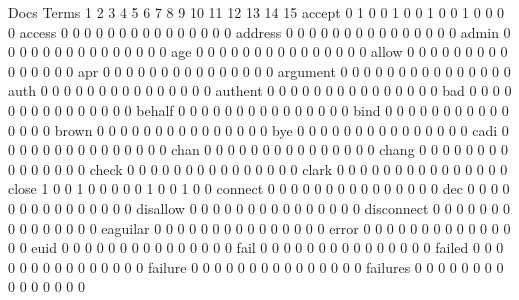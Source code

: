\documentclass[compress,8pt]{beamer}
\begin{document}
\begin{frame}
\begin{Schunk}
                                          Docs
Terms                                      1 2 3 4 5 6 7 8 9 10 11 12 13 14 15
  accept                                   0 1 0 0 1 0 0 1 0  0  1  0  0  0  0
  access                                   0 0 0 0 0 0 0 0 0  0  0  0  0  0  0
  address                                  0 0 0 0 0 0 0 0 0  0  0  0  0  0  0
  admin                                    0 0 0 0 0 0 0 0 0  0  0  0  0  0  0
  age                                      0 0 0 0 0 0 0 0 0  0  0  0  0  0  0
  allow                                    0 0 0 0 0 0 0 0 0  0  0  0  0  0  0
  apr                                      0 0 0 0 0 0 0 0 0  0  0  0  0  0  0
  argument                                 0 0 0 0 0 0 0 0 0  0  0  0  0  0  0
  auth                                     0 0 0 0 0 0 0 0 0  0  0  0  0  0  0
  authent                                  0 0 0 0 0 0 0 0 0  0  0  0  0  0  0
  bad                                      0 0 0 0 0 0 0 0 0  0  0  0  0  0  0
  behalf                                   0 0 0 0 0 0 0 0 0  0  0  0  0  0  0
  bind                                     0 0 0 0 0 0 0 0 0  0  0  0  0  0  0
  brown                                    0 0 0 0 0 0 0 0 0  0  0  0  0  0  0
  bye                                      0 0 0 0 0 0 0 0 0  0  0  0  0  0  0
  cadi                                     0 0 0 0 0 0 0 0 0  0  0  0  0  0  0
  chan                                     0 0 0 0 0 0 0 0 0  0  0  0  0  0  0
  chang                                    0 0 0 0 0 0 0 0 0  0  0  0  0  0  0
  check                                    0 0 0 0 0 0 0 0 0  0  0  0  0  0  0
  clark                                    0 0 0 0 0 0 0 0 0  0  0  0  0  0  0
  close                                    1 0 0 1 0 0 0 0 0  1  0  0  1  0  0
  connect                                  0 0 0 0 0 0 0 0 0  0  0  0  0  0  0
  dec                                      0 0 0 0 0 0 0 0 0  0  0  0  0  0  0
  disallow                                 0 0 0 0 0 0 0 0 0  0  0  0  0  0  0
  disconnect                               0 0 0 0 0 0 0 0 0  0  0  0  0  0  0
  eaguilar                                 0 0 0 0 0 0 0 0 0  0  0  0  0  0  0
  error                                    0 0 0 0 0 0 0 0 0  0  0  0  0  0  0
  euid                                     0 0 0 0 0 0 0 0 0  0  0  0  0  0  0
  fail                                     0 0 0 0 0 0 0 0 0  0  0  0  0  0  0
  failed                                   0 0 0 0 0 0 0 0 0  0  0  0  0  0  0
  failure                                  0 0 0 0 0 0 0 0 0  0  0  0  0  0  0
  failures                                 0 0 0 0 0 0 0 0 0  0  0  0  0  0  0

\end{Schunk}
\end{frame}
\end{document}
